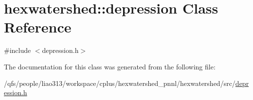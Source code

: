 \hypertarget{classhexwatershed_1_1depression}{\section{hexwatershed\-:\-:depression Class Reference}
\label{classhexwatershed_1_1depression}
}


{\ttfamily \#include $<$depression.\-h$>$}



The documentation for this class was generated from the following file\-:\begin{DoxyCompactItemize}
\item 
/qfs/people/liao313/workspace/cplus/hexwatershed\-\_\-pnnl/hexwatershed/src/\hyperlink{depression_8h}{depression.\-h}\end{DoxyCompactItemize}
